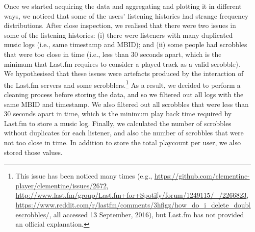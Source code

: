Once we started acquiring the data and aggregating and plotting it in different ways, we noticed that some of the users' listening histories had strange frequency distributions. After close inspection, we realised that there were two issues in some of the listening histories: (i) there were listeners with many duplicated music logs (i.e., same timestamp and MBID); and (ii) some people had scrobbles that were too close in time (i.e., less than 30 seconds apart, which is the minimum that Last.fm requires to consider a played track as a valid scrobble). We hypothesised that these issues were artefacts produced by the interaction of the Last.fm servers and some scrobblers.\footnote{This issue has been noticed many times (e.g., \url{https://github.com/clementine-player/clementine/issues/2672}, \url{http://www.last.fm/group/Last.fm+for+Spotify/forum/1249115/_/2266823}, \url{https://www.reddit.com/r/lastfm/comments/3hfigz/how_do_i_delete_doublescrobbles/}, all accessed 13 September, 2016), but Last.fm has not provided an official explanation.}
As a result, we decided to perform a cleaning process before storing the data, and so we filtered out all logs with the same MBID and timestamp. We also filtered out all scrobbles that were less than 30 seconds apart in time, which is the minimum play back time required by Last.fm to store a music log.
Finally, we calculated the number of scrobbles without duplicates for each listener, and also the number of scrobbles that were not too close in time. In addition to store the total playcount per user, we also stored those values.

